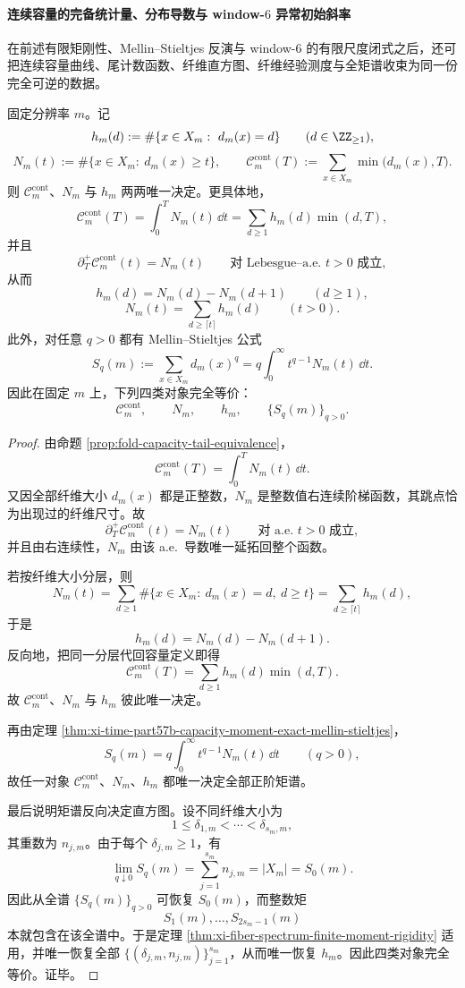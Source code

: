 \paragraph{连续容量的完备统计量、分布导数与 window-\texorpdfstring{$6$}{6} 异常初始斜率}
在前述有限矩刚性、Mellin--Stieltjes 反演与 window-\(6\) 的有限尺度闭式之后，还可把连续容量曲线、尾计数函数、纤维直方图、纤维经验测度与全矩谱收束为同一份完全可逆的数据。

\begin{theorem}[连续容量曲线是纤维直方图与全矩谱的完备统计量]\label{thm:xi-capacity-tail-histogram-moment-complete-statistic}
固定分辨率 \(m\)。记
\[
h_m(d):=\#\{x\in X_m:\ d_m(x)=d\}
\qquad(d\in \ZZ_{\ge 1}),
\]
\[
N_m(t):=\#\{x\in X_m:\ d_m(x)\ge t\},
\qquad
\mathcal C_m^{\mathrm{cont}}(T):=\sum_{x\in X_m}\min\bigl(d_m(x),T\bigr).
\]
则 \(\mathcal C_m^{\mathrm{cont}}\)、\(N_m\) 与 \(h_m\) 两两唯一决定。更具体地，
\[
\mathcal C_m^{\mathrm{cont}}(T)
=
\int_0^T N_m(t)\,\dd t
=
\sum_{d\ge 1}h_m(d)\min(d,T),
\]
并且
\[
\partial_T^+\mathcal C_m^{\mathrm{cont}}(t)=N_m(t)
\qquad\text{对 Lebesgue--a.e.\ }t>0\text{ 成立},
\]
从而
\[
h_m(d)=N_m(d)-N_m(d+1)
\qquad(d\ge 1),
\]
\[
N_m(t)=\sum_{d\ge \lceil t\rceil}h_m(d)
\qquad(t>0).
\]
此外，对任意 \(q>0\) 都有 Mellin--Stieltjes 公式
\[
S_q(m):=\sum_{x\in X_m}d_m(x)^q
=
q\int_0^\infty t^{q-1}N_m(t)\,\dd t.
\]
因此在固定 \(m\) 上，下列四类对象完全等价：
\[
\mathcal C_m^{\mathrm{cont}},
\qquad
N_m,
\qquad
h_m,
\qquad
\{S_q(m)\}_{q>0}.
\]
\end{theorem}
\begin{proof}
由命题 \ref{prop:fold-capacity-tail-equivalence}，
\[
\mathcal C_m^{\mathrm{cont}}(T)=\int_0^T N_m(t)\,\dd t.
\]
又因全部纤维大小 \(d_m(x)\) 都是正整数，\(N_m\) 是整数值右连续阶梯函数，其跳点恰为出现过的纤维尺寸。故
\[
\partial_T^+\mathcal C_m^{\mathrm{cont}}(t)=N_m(t)
\qquad\text{对 a.e.\ }t>0\text{ 成立},
\]
并且由右连续性，\(N_m\) 由该 a.e.\ 导数唯一延拓回整个函数。

若按纤维大小分层，则
\[
N_m(t)
=
\sum_{d\ge 1}\#\{x\in X_m:\ d_m(x)=d,\ d\ge t\}
=
\sum_{d\ge \lceil t\rceil}h_m(d),
\]
于是
\[
h_m(d)=N_m(d)-N_m(d+1).
\]
反向地，把同一分层代回容量定义即得
\[
\mathcal C_m^{\mathrm{cont}}(T)=\sum_{d\ge 1}h_m(d)\min(d,T).
\]
故 \(\mathcal C_m^{\mathrm{cont}}\)、\(N_m\) 与 \(h_m\) 彼此唯一决定。

再由定理 \ref{thm:xi-time-part57b-capacity-moment-exact-mellin-stieltjes}，
\[
S_q(m)=q\int_0^\infty t^{q-1}N_m(t)\,\dd t
\qquad(q>0),
\]
故任一对象 \(\mathcal C_m^{\mathrm{cont}}\)、\(N_m\)、\(h_m\) 都唯一决定全部正阶矩谱。

最后说明矩谱反向决定直方图。设不同纤维大小为
\[
1\le \delta_{1,m}<\cdots<\delta_{s_m,m},
\]
其重数为 \(n_{j,m}\)。由于每个 \(\delta_{j,m}\ge 1\)，有
\[
\lim_{q\downarrow 0}S_q(m)
=
\sum_{j=1}^{s_m}n_{j,m}
=
|X_m|
=
S_0(m).
\]
因此从全谱 \(\{S_q(m)\}_{q>0}\) 可恢复 \(S_0(m)\)，而整数矩
\[
S_1(m),\dots,S_{2s_m-1}(m)
\]
本就包含在该全谱中。于是定理 \ref{thm:xi-fiber-spectrum-finite-moment-rigidity} 适用，并唯一恢复全部 \(\{(\delta_{j,m},n_{j,m})\}_{j=1}^{s_m}\)，从而唯一恢复 \(h_m\)。因此四类对象完全等价。证毕。
\end{proof}

